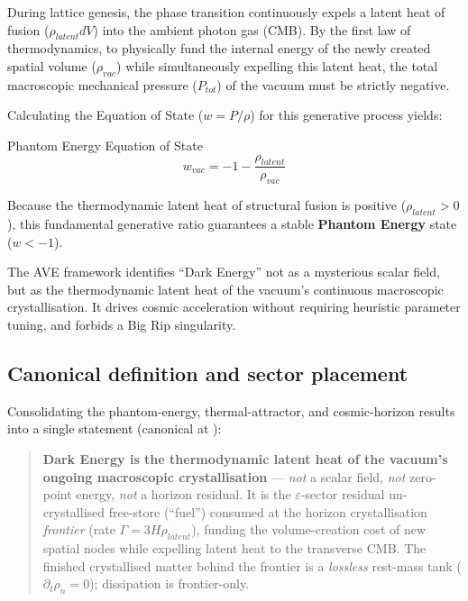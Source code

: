 During lattice genesis, the phase transition continuously expels a latent heat of fusion
($\rho_{latent}dV$) into the ambient photon gas (CMB). By the first law of thermodynamics, to physically fund the internal energy of the newly created spatial volume ($\rho_{vac}$) while simultaneously
expelling this latent heat, the total macroscopic mechanical pressure ($P_{tot}$) of the vacuum
must be strictly negative.

Calculating the Equation of State ($w=P/\rho$) for this generative process yields:

\begin{resultbox}{Phantom Energy Equation of State}
\begin{equation}
w_{vac}=-1-\frac{\rho_{latent}}{\rho_{vac}}
\end{equation}
\end{resultbox}

Because the thermodynamic latent heat of structural fusion is positive ($\rho_{latent} > 0$), this fundamental generative ratio guarantees a stable \textbf{Phantom Energy} state ($w < -1$). 

The AVE framework identifies ``Dark Energy'' not as a mysterious scalar field, but as the
thermodynamic latent heat of the vacuum's continuous macroscopic crystallisation. It drives cosmic acceleration without requiring heuristic parameter tuning, and forbids a Big Rip singularity.

\subsection{Canonical definition and sector placement}
\label{sec:de_canonical_definition}

Consolidating the phantom-energy, thermal-attractor, and cosmic-horizon results
into a single statement (canonical at
):

\begin{quote}
\textbf{Dark Energy is the thermodynamic latent heat of the vacuum's ongoing
macroscopic crystallisation} --- \emph{not} a scalar field, \emph{not} zero-point
energy, \emph{not} a horizon residual. It is the $\varepsilon$-sector residual
un-crystallised free-store (``fuel'') consumed at the horizon crystallisation
\emph{frontier} (rate $\Gamma = 3H\rho_{latent}$), funding the volume-creation
cost of new spatial nodes while expelling latent heat to the transverse CMB. The
finished crystallised matter behind the frontier is a \emph{lossless} rest-mass
tank ($\partial_t \rho_n = 0$); dissipation is frontier-only.
\end{quote}

